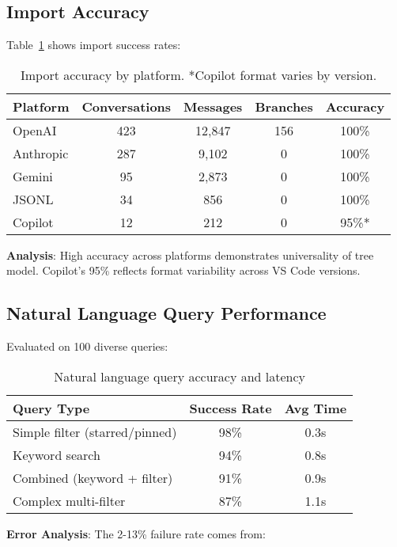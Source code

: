 \documentclass[11pt,letterpaper]{article}
\begin{document}
\subsection{Import Accuracy}

Table~\ref{tab:import-accuracy} shows import success rates:

\begin{table}[h]
\centering
\begin{tabular}{lcccc}
\toprule
Platform & Conversations & Messages & Branches & Accuracy \\
\midrule
OpenAI & 423 & 12,847 & 156 & 100\% \\
Anthropic & 287 & 9,102 & 0 & 100\% \\
Gemini & 95 & 2,873 & 0 & 100\% \\
JSONL & 34 & 856 & 0 & 100\% \\
Copilot & 12 & 212 & 0 & 95\%* \\
\bottomrule
\end{tabular}
\caption{Import accuracy by platform. *Copilot format varies by version.}
\label{tab:import-accuracy}
\end{table}

\textbf{Analysis}: High accuracy across platforms demonstrates universality of tree model. Copilot's 95\% reflects format variability across VS Code versions.

\subsection{Natural Language Query Performance}

Evaluated on 100 diverse queries:

\begin{table}[h]
\centering
\begin{tabular}{lcc}
\toprule
Query Type & Success Rate & Avg Time \\
\midrule
Simple filter (starred/pinned) & 98\% & 0.3s \\
Keyword search & 94\% & 0.8s \\
Combined (keyword + filter) & 91\% & 0.9s \\
Complex multi-filter & 87\% & 1.1s \\
\bottomrule
\end{tabular}
\caption{Natural language query accuracy and latency}
\label{tab:query-performance}
\end{table}

\textbf{Error Analysis}: The 2-13\% failure rate comes from:
\end{document}
